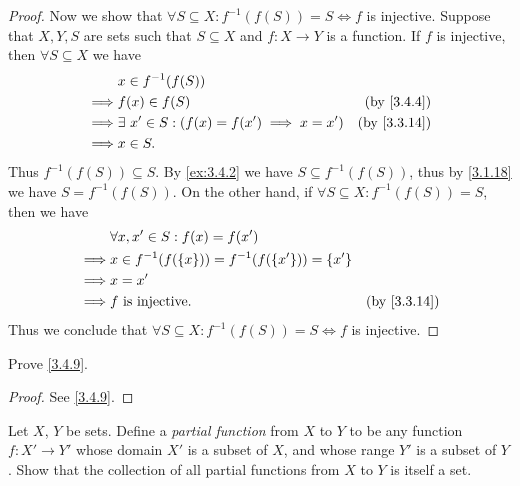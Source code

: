 \begin{proof}
  Now we show that \(\forall S \subseteq X : f^{-1}(f(S)) = S \iff f\) is injective.
  Suppose that \(X, Y, S\) are sets such that \(S \subseteq X\) and \(f : X \to Y\) is a function.
  If \(f\) is injective, then \(\forall S \subseteq X\) we have
  \begin{align*}
             & x \in f^{-1}(f(S))                                                             \\
    \implies & f(x) \in f(S)                                      & \text{(by \cref{3.4.4})}  \\
    \implies & \exists\ x' \in S : (f(x) = f(x') \implies x = x') & \text{(by \cref{3.3.14})} \\
    \implies & x \in S.
  \end{align*}
  Thus \(f^{-1}(f(S)) \subseteq S\).
  By \cref{ex:3.4.2} we have \(S \subseteq f^{-1}(f(S))\), thus by \cref{3.1.18} we have \(S = f^{-1}(f(S))\).
  On the other hand, if \(\forall S \subseteq X : f^{-1}(f(S)) = S\), then we have
  \begin{align*}
             & \forall x, x' \in S : f(x) = f(x')                                              \\
    \implies & x \in f^{-1}(f(\{x\})) = f^{-1}(f(\{x'\})) = \{x'\}                             \\
    \implies & x = x'                                                                          \\
    \implies & f \text{ is injective}.                             & \text{(by \cref{3.3.14})}
  \end{align*}
  Thus we conclude that \(\forall S \subseteq X : f^{-1}(f(S)) = S \iff f\) is injective.
\end{proof}

\begin{ex}\label{ex:3.4.6}
  Prove \cref{3.4.9}.
\end{ex}

\begin{proof}
  See \cref{3.4.9}.
\end{proof}

\begin{ex}\label{ex:3.4.7}
  Let \(X\), \(Y\) be sets.
  Define a \emph{partial function} from \(X\) to \(Y\) to be any function \(f : X' \to Y'\) whose domain \(X'\) is a subset of \(X\), and whose range \(Y'\) is a subset of \(Y\).
  Show that the collection of all partial functions from \(X\) to \(Y\) is itself a set.
\end{ex}

